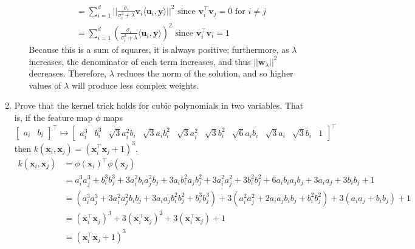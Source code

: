 \documentclass{article}
\begin{document}
\begin{enumerate}[label=\arabic*.]
\begin{enumerate}
{\begin{align*}
		&= \sum\limits_{i = 1}^d ||\frac{\sigma_i}{\sigma_i^2 + \lambda}\mathbf{v}_i\langle \mathbf{u}_i, \mathbf{y} \rangle||^2 \text{ since } \mathbf{v}_i^{\top}\mathbf{v}_j = 0 \text{ for } i \neq j \\
		&= \sum\limits_{i = 1}^d (\frac{\sigma_i}{\sigma_i^2 + \lambda}\langle \mathbf{u}_i, \mathbf{y} \rangle)^2 \text{ since } \mathbf{v}_i^{\top}\mathbf{v}_i = 1
		\end{align*} Because this is a sum of squares, it is always positive; furthermore, as $\lambda$ increases, the denominator of each term increases, and thus $||\mathbf{w}_\lambda ||^2$ decreases. Therefore, $\lambda$ reduces the norm of the solution, and so higher values of $\lambda$ will produce less complex weights.}
		\end{enumerate}
\item Prove that the kernel trick holds for cubic polynomials in two variables. That is, if the feature map $\phi$ maps $$\begin{bmatrix} a_i & b_i \end{bmatrix}^{\top} \mapsto \begin{bmatrix} a_i^3 & b_i^3 & \sqrt{3}a_i^2b_i & \sqrt{3}a_ib_i^2 & \sqrt{3}a_i^2 & \sqrt{3}b_i^2 & \sqrt{6}a_ib_i & \sqrt{3}a_i & \sqrt{3}b_i & 1 \end{bmatrix}^{\top}$$ then $k(\mathbf{x}_i, \mathbf{x}_j) = (\mathbf{x}_i^{\top}\mathbf{x}_j + 1)^3$. \\
{\color{blue} \begin{align*}
k(\mathbf{x}_i, \mathbf{x}_j) &= \phi(\mathbf{x}_i)^{\top}\phi(\mathbf{x}_j) \\
&= a_i^3a_j^3 + b_i^3b_j^3 + 3a_i^2b_ia_j^2b_j + 3a_ib_i^2a_jb_j^2 + 3a_i^2a_j^2 + 3b_i^2b_j^2 + 6a_ib_ia_jb_j + 3a_ia_j + 3b_ib_j + 1 \\
&= (a_i^3a_j^3 + 3a_i^2a_j^2b_ib_j + 3a_ia_jb_i^2b_j^2 + b_i^3b_j^3) + 3(a_i^2a_j^2 + 2a_ia_jb_ib_j + b_i^2b_j^2) + 3(a_ia_j + b_ib_j) + 1 \\
&= (\mathbf{x}_i^{\top}\mathbf{x}_j)^3 + 3(\mathbf{x}_i^{\top}\mathbf{x}_j)^2 + 3(\mathbf{x}_i^{\top}\mathbf{x}_j) + 1 \\
&= (\mathbf{x}_i^{\top}\mathbf{x}_j + 1)^3
\end{align*}}
\end{enumerate}
\end{document}
